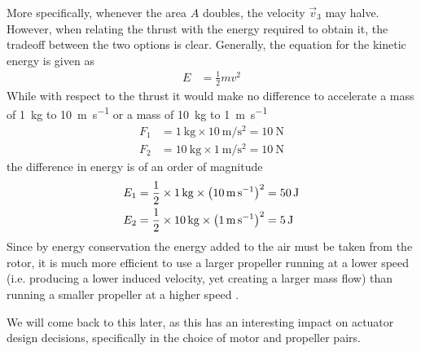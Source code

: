 More specifically, whenever the area $A$ doubles, the velocity $\vec{v}_{3}$ may halve.
However, when relating the thrust with the energy required to obtain it, the tradeoff between the two options is clear. 
Generally, the equation for the kinetic energy is given as
%
\begin{align}
E &= \frac{1}{2} m v^2
\end{align}
%
While with respect to the thrust it would make no difference to accelerate a mass of \SI{1}{\kilo\gram} to \SI{10}{\meter\per\second} or a mass of \SI{10}{\kilo\gram} to \SI{1}{\meter\per\second}
%
\begin{align*}
F_1 &= \SI{1}{\kilo\gram} \times \SI{10}{\meter\per\second^2} = \SI{10}{\newton} \\
F_2 &= \SI{10}{\kilo\gram} \times \SI{1}{\meter\per\second^2} = \SI{10}{\newton}
\end{align*}
%
the difference in energy is of an order of magnitude
%
\begin{align*}
E_1 &= \frac{1}{2} \times \SI{1}{\kilo\gram} \times \left( \SI{10}{\meter\per\second} \right)^2 = \SI{50}{\joule} \\
E_2 &= \frac{1}{2} \times \SI{10}{\kilo\gram} \times \left( \SI{1}{\meter\per\second} \right)^2 = \SI{5}{\joule}
\end{align*}
%
Since by energy conservation the energy added to the air must be taken from the rotor, it is much more efficient to use a larger propeller running at a lower speed (i.e. producing a lower induced velocity, yet creating a larger mass flow) than running a smaller propeller at a higher speed \cite{book:mechflight2006}.


We will come back to this later, as this has an interesting impact on actuator design decisions, specifically in the choice of motor and propeller pairs.




